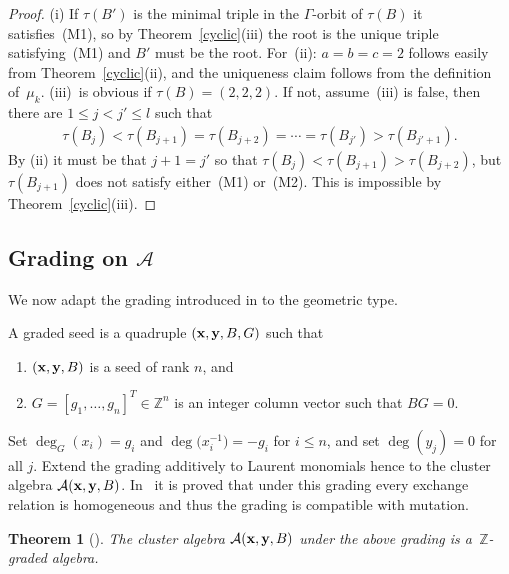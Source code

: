 \documentclass[11pt]{article}
\numberwithin{equation}{section}
\newtheorem{Theorem}{Theorem}[section]
\begin{document}
\begin{proof}
(i) If $\tau(B')$ is the minimal triple in the $\Gamma$-orbit of $\tau(B)$ it satisf\/ies~(M1), so by Theo\-rem~\ref{cyclic}(iii) the root is the unique triple satisfying~(M1) and $B'$ must be the root.
For~(ii): $a=b=c=2$ follows easily from Theorem~\ref{cyclic}(ii), and the uniqueness claim follows from the def\/inition of~$\mu_k$.
 (iii)~is obvious if  $\tau(B)=(2,2,2)$. If not, assume~(iii) is false, then there are $1\le j<j'\le l$ such that
 \begin{gather*}
 \tau(B_j)<\tau(B_{j+1})=\tau(B_{j+2})=\cdots=\tau(B_{j'})>\tau(B_{j'+1}).
 \end{gather*}
By (ii) it must be that $j+1=j'$ so that  $\tau(B_j)< \tau(B_{j+1}) > \tau(B_{j+2})$, but $\tau(B_{j+1})$ does not satisfy either~(M1) or~(M2). This is impossible by Theorem~\ref{cyclic}(iii).
\end{proof}

\subsection[Grading on~$\mathcal{A}$]{Grading on $\boldsymbol{\mathcal{A}}$}\label{section4.2}

We now adapt the grading introduced in \cite[Def\/inition 3.1]{G} to the geometric type.
\begin{Definition}
A graded seed is a quadruple $({\bf x},{\bf y},B,G)$ such that
\begin{enumerate}\itemsep=0pt
\item[(i)] $({\bf x},{\bf y},B)$ is a seed of rank $n$, and
\item[(ii)] $G=[g_1,\dots,g_n]^T\in \mathbb{Z}^n$ is an integer column vector such that $BG=0$.
\end{enumerate}
\end{Definition}

Set $\deg_G(x_i)=g_i$ and $\deg\big(x_i^{-1}\big)=-g_i$ for $i\le n$, and set $\deg(y_j)=0$ for all $j$. Extend the grading additively to Laurent monomials hence to the cluster algebra $\mathcal{A}({\bf x},{\bf y},B)$. In~\cite{G} it is proved that under this grading every exchange relation is homogeneous and thus the grading is compatible with mutation.

\begin{Theorem}[]
The cluster algebra $\mathcal{A}({\bf x},{\bf y},B)$ under the above grading is a~$\mathbb{Z}$-graded algebra.
\end{Theorem}
\end{document}
